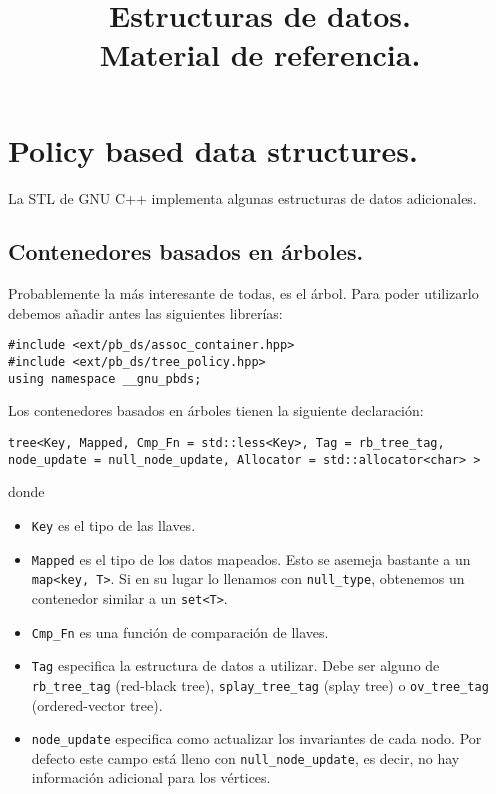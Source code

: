 \documentclass[12pt, letterpaper, twoside]{article}
\title{Estructuras de datos.\\
	  \large Material de referencia.}
\author{}
\date{}
\begin{document}
\maketitle

\tableofcontents

\newpage

\section{Policy based data structures.}

La STL de GNU C++ implementa algunas estructuras de datos adicionales.

\subsection{Contenedores basados en árboles.}

Probablemente la más interesante de todas, es el árbol. Para poder utilizarlo debemos añadir antes las siguientes librerías:

\begin{lstlisting}
#include <ext/pb_ds/assoc_container.hpp>
#include <ext/pb_ds/tree_policy.hpp>
using namespace __gnu_pbds;
\end{lstlisting}

Los contenedores basados en árboles tienen la siguiente declaración:

\begin{lstlisting}
tree<Key, Mapped, Cmp_Fn = std::less<Key>, Tag = rb_tree_tag, node_update = null_node_update, Allocator = std::allocator<char> >
\end{lstlisting}

donde
\begin{itemize}
\item \texttt{Key} es el tipo de las llaves.

\item \texttt{Mapped} es el tipo de los datos mapeados. Esto se asemeja bastante a un \texttt{map<key, T>}. Si en su lugar lo llenamos con \texttt{null\_type}, obtenemos un contenedor similar a un \texttt{set<T>}.

\item \texttt{Cmp\_Fn} es una función de comparación de llaves.

\item \texttt{Tag} especifica la estructura de datos a utilizar. Debe ser alguno de \texttt{rb\_tree\_tag} (red-black tree), \texttt{splay\_tree\_tag} (splay tree) o \texttt{ov\_tree\_tag} (ordered-vector tree).

\item \texttt{node\_update} especifica como actualizar los invariantes de cada nodo. Por defecto este campo está lleno con \texttt{null\_node\_update}, es decir, no hay información adicional para los vértices.
\end{itemize}
\end{document}
